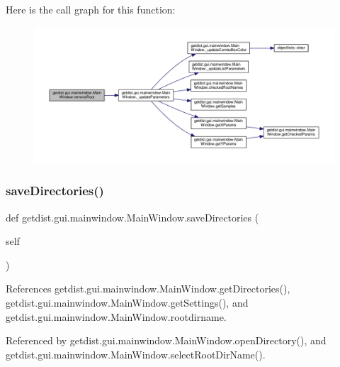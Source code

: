 Here is the call graph for this function\+:
\nopagebreak
\begin{figure}[H]
\begin{center}
\leavevmode
\includegraphics[width=350pt]{classgetdist_1_1gui_1_1mainwindow_1_1MainWindow_a201a21f90476804e9c5917012c06add2_cgraph}
\end{center}
\end{figure}
\mbox{\label{classgetdist_1_1gui_1_1mainwindow_1_1MainWindow_ad54b990be48269b8e9375dac2a68ee9c}} 
\subsubsection{\texorpdfstring{save\+Directories()}{saveDirectories()}}
{\footnotesize\ttfamily def getdist.\+gui.\+mainwindow.\+Main\+Window.\+save\+Directories (\begin{DoxyParamCaption}\item[{}]{self }\end{DoxyParamCaption})}



References getdist.\+gui.\+mainwindow.\+Main\+Window.\+get\+Directories(), getdist.\+gui.\+mainwindow.\+Main\+Window.\+get\+Settings(), and getdist.\+gui.\+mainwindow.\+Main\+Window.\+rootdirname.



Referenced by getdist.\+gui.\+mainwindow.\+Main\+Window.\+open\+Directory(), and getdist.\+gui.\+mainwindow.\+Main\+Window.\+select\+Root\+Dir\+Name().

